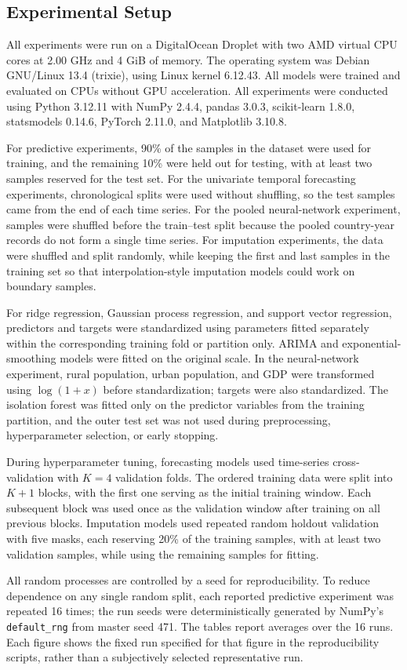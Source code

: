 \subsection{Experimental Setup}

All experiments were run on a DigitalOcean Droplet with two AMD virtual CPU cores at 2.00 GHz and 4 GiB of memory. The operating system was Debian GNU/Linux 13.4 (trixie), using Linux kernel 6.12.43. All models were trained and evaluated on CPUs without GPU acceleration. All experiments were conducted using Python 3.12.11 with NumPy 2.4.4, pandas 3.0.3, scikit-learn 1.8.0, statsmodels 0.14.6, PyTorch 2.11.0, and Matplotlib 3.10.8.

For predictive experiments, 90\% of the samples in the dataset were used for training, and the remaining 10\% were held out for testing, with at least two samples reserved for the test set.
For the univariate temporal forecasting experiments, chronological splits were used without shuffling, so the test samples came from the end of each time series.
For the pooled neural-network experiment, samples were shuffled before the train--test split because the pooled country-year records do not form a single time series.
For imputation experiments, the data were shuffled and split randomly, while keeping the first and last samples in the training set so that interpolation-style imputation models could work on boundary samples.

For ridge regression, Gaussian process regression, and support vector regression, predictors and targets were standardized using parameters fitted separately within the corresponding training fold or partition only. ARIMA and exponential-smoothing models were fitted on the original scale. In the neural-network experiment, rural population, urban population, and GDP were transformed using \(\log(1+x)\) before standardization; targets were also standardized. The isolation forest was fitted only on the predictor variables from the training partition, and the outer test set was not used during preprocessing, hyperparameter selection, or early stopping.

During hyperparameter tuning, forecasting models used time-series cross-validation with \(K = 4\) validation folds. The ordered training data were split into \(K + 1\) blocks, with the first one serving as the initial training window. Each subsequent block was used once as the validation window after training on all previous blocks. Imputation models used repeated random holdout validation with five masks, each reserving 20\% of the training samples, with at least two validation samples, while using the remaining samples for fitting.

All random processes are controlled by a seed for reproducibility. To reduce dependence on any single random split, each reported predictive experiment was repeated 16 times; the run seeds were deterministically generated by NumPy's \texttt{default\_rng} from master seed 471. The tables report averages over the 16 runs. Each figure shows the fixed run specified for that figure in the reproducibility scripts, rather than a subjectively selected representative run.
